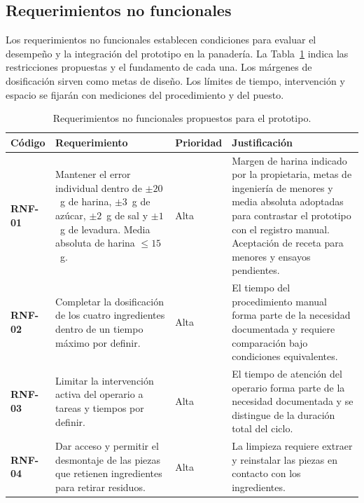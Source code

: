 \subsection{Requerimientos no funcionales}
\label{subsec:requerimientos_no_funcionales}

Los requerimientos no funcionales establecen condiciones para evaluar el
desempeño y la integración del prototipo en la panadería. La
Tabla~\ref{tab:requerimientos_no_funcionales_prototipo} indica las
restricciones propuestas y el fundamento de cada una. Los márgenes
de dosificación sirven como metas de diseño. Los límites de tiempo,
intervención y espacio se fijarán con mediciones del procedimiento
y del puesto.

\begin{table}[H]
    \centering
    \caption{Requerimientos no funcionales propuestos para el prototipo.}
    \label{tab:requerimientos_no_funcionales_prototipo}
    \footnotesize
    \setlength{\tabcolsep}{3pt}
    \renewcommand{\arraystretch}{1.2}
    \begin{tabularx}{\textwidth}{p{}p{}p{}X}
        \toprule[1pt]
        \textbf{Código} & \textbf{Requerimiento} & \textbf{Prioridad} & \textbf{Justificación} \\
        \midrule[1pt]
        \textbf{RNF-01} & Mantener el error individual dentro de $\pm20$~g de harina, $\pm3$~g de azúcar, $\pm2$~g de sal y $\pm1$~g de levadura. Media absoluta de harina $\leq15$~g. & Alta & Margen de harina indicado por la propietaria, metas de ingeniería de menores y media absoluta adoptadas para contrastar el prototipo con el registro manual. Aceptación de receta para menores y ensayos pendientes. \\
        \addlinespace[5pt]
        \textbf{RNF-02} & Completar la dosificación de los cuatro ingredientes dentro de un tiempo máximo por definir. & Alta & El tiempo del procedimiento manual forma parte de la necesidad documentada y requiere comparación bajo condiciones equivalentes. \\
        \addlinespace[5pt]
        \textbf{RNF-03} & Limitar la intervención activa del operario a tareas y tiempos por definir. & Alta & El tiempo de atención del operario forma parte de la necesidad documentada y se distingue de la duración total del ciclo. \\
        \addlinespace[5pt]
        \textbf{RNF-04} & Dar acceso y permitir el desmontaje de las piezas que retienen ingredientes para retirar residuos. & Alta & La limpieza requiere extraer y reinstalar las piezas en contacto con los ingredientes. \\

\end{tabularx}
\end{table}
